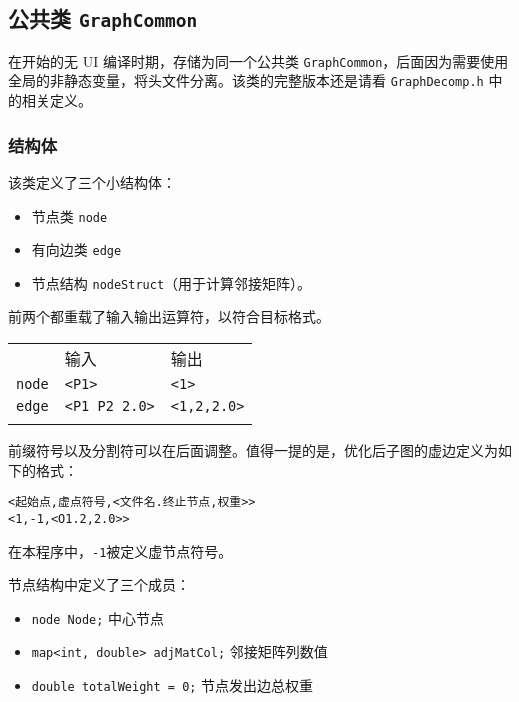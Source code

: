 \documentclass[
]{article}
\begin{document}
\hypertarget{header-n44}{%
\subsection{\texorpdfstring{公共类
\texttt{GraphCommon}}{公共类 GraphCommon}}\label{header-n44}}

在开始的无 UI 编译时期，存储为同一个公共类
\texttt{GraphCommon}，后面因为需要使用全局的非静态变量，将头文件分离。该类的完整版本还是请看
\texttt{GraphDecomp.h} 中的相关定义。

\hypertarget{header-n46}{%
\subsubsection{结构体}\label{header-n46}}

该类定义了三个小结构体：

\begin{itemize}
\item
  节点类 \texttt{node}
\item
  有向边类 \texttt{edge}
\item
  节点结构 \texttt{nodeStruct}（用于计算邻接矩阵）。
\end{itemize}

前两个都重载了输入输出运算符，以符合目标格式。

\begin{longtable}[]{@{}lll@{}}
\toprule
& 输入 & 输出 \\ \addlinespace
\midrule
\endhead
\texttt{node} & \texttt{\textless{}P1\textgreater{}} &
\texttt{\textless{}1\textgreater{}} \\ \addlinespace
\texttt{edge} & \texttt{\textless{}P1\ P2\ 2.0\textgreater{}} &
\texttt{\textless{}1,2,2.0\textgreater{}} \\ \addlinespace
\bottomrule
\end{longtable}

前缀符号以及分割符可以在后面调整。值得一提的是，优化后子图的虚边定义为如下的格式：

\begin{verbatim}
<起始点,虚点符号,<文件名.终止节点,权重>>
<1,-1,<O1.2,2.0>>
\end{verbatim}

在本程序中，\texttt{-1}被定义虚节点符号。

节点结构中定义了三个成员：

\begin{itemize}
\item
  \texttt{node\ Node;} 中心节点
\item
  \texttt{map\textless{}int,\ double\textgreater{}\ adjMatCol;}
  邻接矩阵列数值
\item
  \texttt{double\ totalWeight\ =\ 0;} 节点发出边总权重
\end{itemize}
\end{document}

